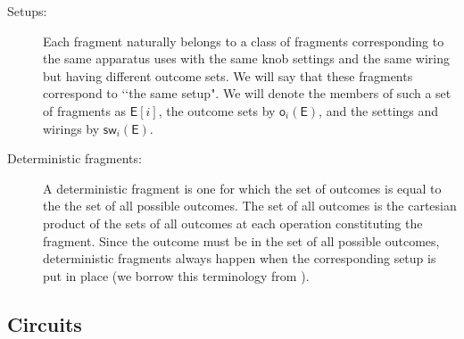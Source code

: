 \documentclass[10pt]{article}
\begin{document}
\begin{description}
\item[Setups:]  Each fragment naturally belongs to a class of fragments corresponding to the same apparatus uses with the same knob settings and the same wiring but having different outcome sets.  We will say that these fragments correspond to \lq\lq the same setup".  We will denote the members of such a set of fragments as $\mathsf{E}[i]$, the outcome sets by $\mathsf{ o}_i(\mathsf{ E})$, and the settings and wirings by $\mathsf{ sw}_i(\mathsf{E})$.
\item[Deterministic fragments:] A deterministic fragment is one for which the set of outcomes is equal to the the set of all possible outcomes.  The set of all outcomes is the cartesian product of the sets of all outcomes at each operation constituting the fragment.  Since the outcome must be in the set of all possible outcomes, deterministic fragments always happen when the corresponding setup is put in place (we borrow this terminology from \cite{chiribella2010probabilistic}).
\end{description}






\subsection{Circuits}
\end{document}
